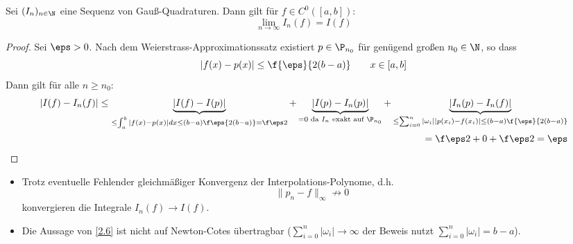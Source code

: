 \documentclass[11pt]{scrartcl}
\begin{document}
\begin{st}[Konvergenz]
	\label{2.26}
	Sei $(I_n)_{n\in \N}$ eine Sequenz von Gauß-Quadraturen.
	Dann gilt für $f\in C^0([a,b])$:
	\[
		\lim_{n\to \infty} I_n(f) = I(f)
	\]
	\begin{proof}
		Sei $\eps > 0$.
		Nach dem Weierstrass-Approximationssatz existiert $p\in \P_{n_0}$ für genügend großen $n_0\in \N$, so dass
		\[
			|f(x) - p(x)| \le \f {\eps}{2(b-a)} \qquad x\in [a,b]
		\]
		Dann gilt für alle $n\ge n_0$:
		\begin{align*}
			|I(f) - I_n(f)|
			\le \underbrace{|I(f) - I(p)|}_{\le \int_a^b |f(x) - p(x)| dx \le (b-a)\f \eps{2(b-a)}= \f \eps 2} 
			+ \underbrace{|I(p) - I_n(p)|}_{=0 \text{ da $I_n$ exakt auf $\P_{n_0}$}} 
			+ \underbrace{|I_n(p)-I_n(f)|}_{\le \sum_{i=0}^n |\omega_i||p(x_i)-f(x_i)| \le (b-a) \f {\eps}{2(b-a)} } \\
			= \f \eps 2 + 0 + \f \eps 2 = \eps
		\end{align*}
	\end{proof}
	\begin{note}
		\begin{itemize}
			\item
				Trotz eventuelle Fehlender gleichmäßiger Konvergenz der Interpolations-Polynome, d.h.
				\[
					\|p_n - f\|_\infty \not \to 0
				\]
				konvergieren die Integrale $I_n(f) \to I(f)$.
			\item
				Die Aussage von \ref{2.6} ist nicht auf Newton-Cotes übertragbar ($\sum_{i=0}^n |\omega_i| \to \infty$ der Beweis nutzt $\sum_{i=0}^n |\omega_i| = b-a$).
		\end{itemize}
	\end{note}
\end{st}
\end{document}
